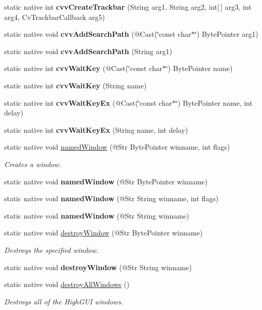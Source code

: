 \begin{DoxyCompactItemize}
\item 
static native int {\bfseries cvv\+Create\+Trackbar} (String arg1, String arg2, int\mbox{[}$\,$\mbox{]} arg3, int arg4, Cv\+Trackbar\+Callback arg5)
\item 
static native void {\bfseries cvv\+Add\+Search\+Path} (@Cast(\char`\"{}const char$\ast$\char`\"{}) Byte\+Pointer arg1)
\item 
static native void {\bfseries cvv\+Add\+Search\+Path} (String arg1)
\item 
static native int {\bfseries cvv\+Wait\+Key} (@Cast(\char`\"{}const char$\ast$\char`\"{}) Byte\+Pointer name)
\item 
static native int {\bfseries cvv\+Wait\+Key} (String name)
\item 
static native int {\bfseries cvv\+Wait\+Key\+Ex} (@Cast(\char`\"{}const char$\ast$\char`\"{}) Byte\+Pointer name, int delay)
\item 
static native int {\bfseries cvv\+Wait\+Key\+Ex} (String name, int delay)
\item 
static native void \hyperlink{group__highgui_gad8dcfc13dd30b1339b3fc7fb3fb19603}{named\+Window} (@Str Byte\+Pointer winname, int flags)
\begin{DoxyCompactList}\small\item\em Creates a window. \end{DoxyCompactList}\item 
static native void {\bfseries named\+Window} (@Str Byte\+Pointer winname)
\item 
static native void {\bfseries named\+Window} (@Str String winname, int flags)
\item 
static native void {\bfseries named\+Window} (@Str String winname)
\item 
static native void \hyperlink{group__highgui_ga3fd651e0fd7a9c3d290d4217cdcebbcf}{destroy\+Window} (@Str Byte\+Pointer winname)
\begin{DoxyCompactList}\small\item\em Destroys the specified window. \end{DoxyCompactList}\item 
static native void {\bfseries destroy\+Window} (@Str String winname)
\item 
static native void \hyperlink{group__highgui_gaff06efa4a5f234c304b6f498075abd1a}{destroy\+All\+Windows} ()
\begin{DoxyCompactList}\small\item\em Destroys all of the High\+G\+UI windows. \end{DoxyCompactList}\item 

\end{DoxyCompactItemize}
